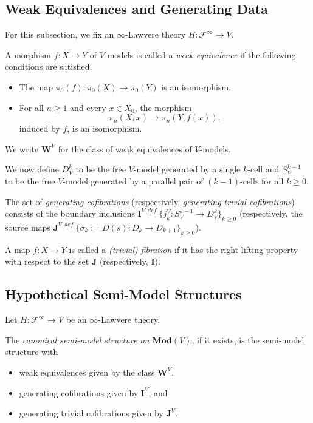 \documentclass{tac}
\begin{document}
\subsection*{Weak Equivalences and Generating Data}
For this subsection, we fix an $\infty$-Lawvere theory $H:\mathcal{F}^\infty\to V$.

\begin{definition}
A morphism $f:X\to Y$ of $V$-models is called a \emph{weak equivalence} if the following conditions are satisfied.
\begin{itemize}
	\item The map $\pi_0(f):\pi_0(X)\to\pi_0(Y)$ is an isomorphism.
	\item For all $n\geq 1$ and every $x\in X_0$, the morphism
	\[
	\pi_n(X,x)\to\pi_n(Y,f(x)),
	\]
	induced by $f$, is an isomorphism.
\end{itemize}
\end{definition}

\begin{notation}
We write $\mathbf{W}^V$ for the class of weak equivalences of $V$-models.
\end{notation}

We now define $D^k_V$ to be the free $V$-model generated by a single $k$-cell and $S^{k-1}_V$ to be the free $V$-model generated by a parallel pair of $(k-1)$-cells for all $k\geq 0$.

\begin{definition}
The set of \emph{generating cofibrations} (respectively, \emph{generating trivial cofibrations}) consists of the boundary inclusions
$\mathbf{I}^V\overset{def}{=}\{j^V_k:S_V^{k-1}\rightarrow D_V^k\}_{k\geq 0}$
(respectively, the source maps
$\mathbf{J}^V\overset{def}{=}\{\sigma_k:=D(s):D_k\rightarrow D_{k+1}\}_{k\geq 0}$).
\end{definition}

\begin{definition}
A map $f:X\to Y$ is called a \emph{(trivial) fibration} if it has the right lifting property with respect to the set $\mathbf{J}$ (respectively, $\mathbf{I}$).
\end{definition}
\subsection*{Hypothetical Semi-Model Structures}
Let $H:\mathcal{F}^\infty\to V$ be an $\infty$-Lawvere theory.

\begin{definition}
The \emph{canonical semi-model structure on $\mathbf{Mod}(V)$}, if it exists, is the semi-model structure with
\begin{itemize}
    \item weak equivalences given by the class $\mathbf{W}^V$,
    \item generating cofibrations given by $\mathbf{I}^V$, and
    \item generating trivial cofibrations given by $\mathbf{J}^V$.
\end{itemize}
\end{definition}
\end{document}
